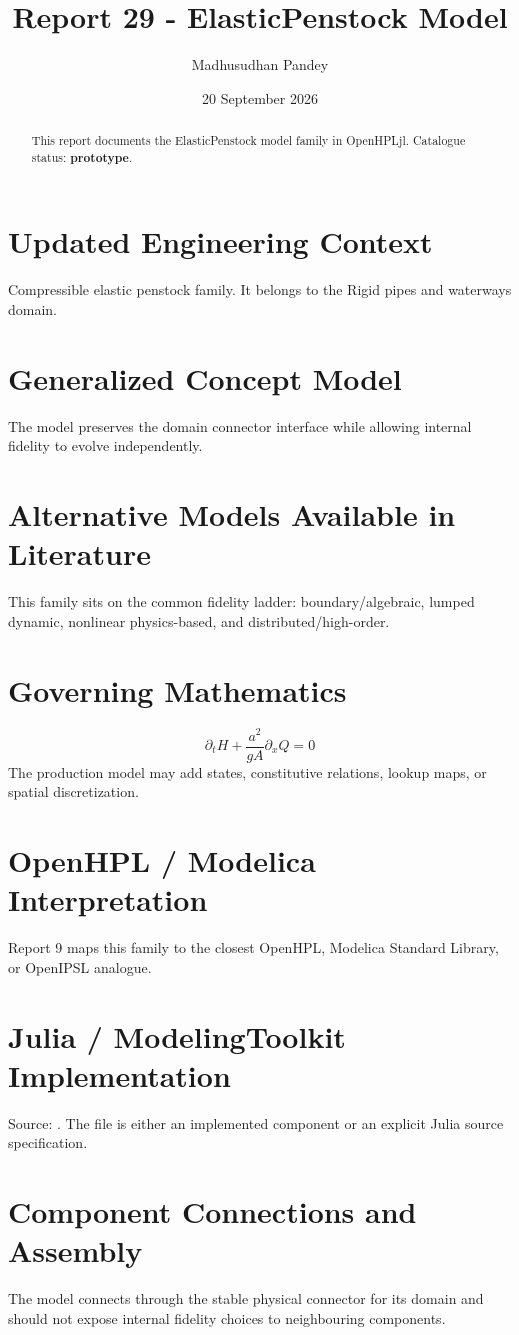 \documentclass[10pt,a4paper]{article}
\title{Report 29 - ElasticPenstock Model}
\author{Madhusudhan Pandey}
\date{20 September 2026}
\begin{document}
\maketitle
\begin{abstract}This report documents the ElasticPenstock model family in OpenHPLjl. Catalogue status: \textbf{prototype}.\end{abstract}
\section{Updated Engineering Context}Compressible elastic penstock family. It belongs to the Rigid pipes and waterways domain.
\section{Generalized Concept Model}The model preserves the domain connector interface while allowing internal fidelity to evolve independently.
\section{Alternative Models Available in Literature}This family sits on the common fidelity ladder: boundary/algebraic, lumped dynamic, nonlinear physics-based, and distributed/high-order.
\section{Governing Mathematics}\[\partial_t H+\frac{a^2}{gA}\partial_x Q=0\]The production model may add states, constitutive relations, lookup maps, or spatial discretization.
\section{OpenHPL / Modelica Interpretation}Report 9 maps this family to the closest OpenHPL, Modelica Standard Library, or OpenIPSL analogue.
\section{Julia / ModelingToolkit Implementation}Source: \texttt{}. The file is either an implemented component or an explicit Julia source specification.
\section{Component Connections and Assembly}The model connects through the stable physical connector for its domain and should not expose internal fidelity choices to neighbouring components.
\end{document}
